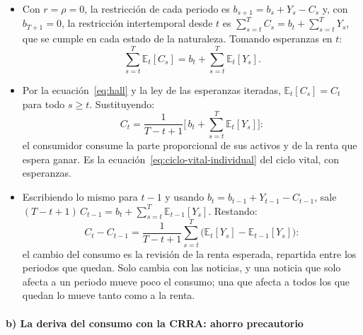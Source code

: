 \documentclass[11pt]{article}
\begin{document}
\begin{itemize}
\item Con $r=\rho=0$, la restricción de cada periodo es $b_{s+1}=b_s+Y_s-C_s$ y, con $b_{T+1}=0$, la restricción intertemporal desde $t$ es $\sum_{s=t}^{T}C_s=b_t+\sum_{s=t}^{T}Y_s$, que se cumple en cada estado de la naturaleza. Tomando esperanzas en $t$:
  \begin{equation*}
  \sum_{s=t}^{T}\mathbb{E}_t[C_s]=b_t+\sum_{s=t}^{T}\mathbb{E}_t[Y_s].
  \end{equation*}
\item Por la ecuación~\eqref{eq:hall} y la ley de las esperanzas iteradas, $\mathbb{E}_t[C_s]=C_t$ para todo $s\geq t$. Sustituyendo:
  \begin{equation*}
  C_t=\frac{1}{T-t+1}\Big[\,b_t+\sum_{s=t}^{T}\mathbb{E}_t[Y_s]\Big]:
  \end{equation*}
  el consumidor consume la parte proporcional de sus activos y de la renta que espera ganar. Es la ecuación~\eqref{eq:ciclo-vital-individual} del ciclo vital, con esperanzas.
\item Escribiendo lo mismo para $t-1$ y usando $b_t=b_{t-1}+Y_{t-1}-C_{t-1}$, sale $(T-t+1)\,C_{t-1}=b_t+\sum_{s=t}^{T}\mathbb{E}_{t-1}[Y_s]$. Restando:
  \begin{equation*}
  C_t-C_{t-1}=\frac{1}{T-t+1}\sum_{s=t}^{T}\big(\mathbb{E}_t[Y_s]-\mathbb{E}_{t-1}[Y_s]\big):
  \end{equation*}
  el cambio del consumo es la revisión de la renta esperada, repartida entre los periodos que quedan. Solo cambia con las noticias, y una noticia que solo afecta a un periodo mueve poco el consumo; una que afecta a todos los que quedan lo mueve tanto como a la renta.\findemo
\end{itemize}

\paragraph{b) La deriva del consumo con la CRRA: ahorro precautorio}
\end{document}
